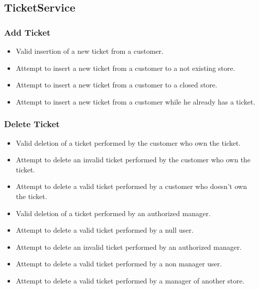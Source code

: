\subsection{TicketService}
\subsubsection{Add Ticket}
\begin{itemize}
	\item Valid insertion of a new ticket from a customer.
	\item Attempt to insert a new ticket from a customer to a not existing store.
	\item Attempt to insert a new ticket from a customer to a closed store.
	\item Attempt to insert a new ticket from a customer while he already has a ticket.
\end{itemize}

\subsubsection{Delete Ticket}
\begin{itemize}
	\item Valid deletion of a ticket performed by the customer who own the ticket.
	\item Attempt to delete an invalid ticket performed by the customer who own the ticket.
	\item Attempt to delete a valid ticket performed by a customer who doesn't own the ticket.
	\item Valid deletion of a ticket performed by an authorized manager.
	\item Attempt to delete a valid ticket performed by a null user.
	\item Attempt to delete an invalid ticket performed by an authorized manager.
	\item Attempt to delete a valid ticket performed by a non manager user.
	\item Attempt to delete a valid ticket performed by a manager of another store.
\end{itemize}

